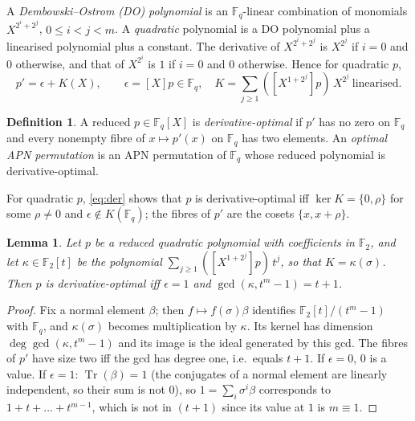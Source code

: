 \documentclass[preprint,12pt]{elsarticle}
\newtheorem{lemma}[theorem]{Lemma}
\theoremstyle{definition}
\newtheorem{definition}[theorem]{Definition}
\newcommand{\F}{\mathbb{F}}
\newcommand{\Tr}{\operatorname{Tr}}
\begin{document}
A \emph{Dembowski--Ostrom (DO) polynomial} is an $\F_q$-linear combination of monomials $X^{2^i+2^j}$, $0\le i<j<m$. A \emph{quadratic} polynomial is a DO polynomial plus a linearised polynomial plus a constant. The derivative of $X^{2^i+2^j}$ is $X^{2^j}$ if $i=0$ and $0$ otherwise, and that of $X^{2^i}$ is $1$ if $i=0$ and $0$ otherwise. Hence for quadratic $p$,
\begin{equation}\label{eq:der}
p'=\epsilon+K(X),\qquad \epsilon=[X]p\in\F_q,\quad K=\sum_{j\ge1}([X^{1+2^j}]p)\,X^{2^j}\ \text{linearised}.
\end{equation}

\begin{definition}\label{def:opt}
A reduced $p\in\F_q[X]$ is \emph{derivative-optimal} if $p'$ has no zero on $\F_q$ and every nonempty fibre of $x\mapsto p'(x)$ on $\F_q$ has two elements. An \emph{optimal APN permutation} is an APN permutation of $\F_q$ whose reduced polynomial is derivative-optimal.
\end{definition}
For quadratic $p$, \eqref{eq:der} shows that $p$ is derivative-optimal iff $\ker K=\{0,\rho\}$ for some $\rho\ne0$ and $\epsilon\notin K(\F_q)$; the fibres of $p'$ are the cosets $\{x,x+\rho\}$.

\begin{lemma}\label{lem:O}
Let $p$ be a reduced quadratic polynomial with coefficients in $\F_2$, and let $\kappa\in\F_2[t]$ be the polynomial $\sum_{j\ge1}([X^{1+2^j}]p)\,t^j$, so that $K=\kappa(\sigma)$. Then $p$ is derivative-optimal iff $\epsilon=1$ and $\gcd(\kappa,t^m-1)=t+1$.
\end{lemma}
\begin{proof}
Fix a normal element $\beta$; then $f\mapsto f(\sigma)\beta$ identifies $\F_2[t]/(t^m-1)$ with $\F_q$, and $\kappa(\sigma)$ becomes multiplication by $\kappa$. Its kernel has dimension $\deg\gcd(\kappa,t^m-1)$ and its image is the ideal generated by this gcd. The fibres of $p'$ have size two iff the gcd has degree one, i.e.\ equals $t+1$. If $\epsilon=0$, $0$ is a value. If $\epsilon=1$: $\Tr(\beta)=1$ (the conjugates of a normal element are linearly independent, so their sum is not $0$), so $1=\sum_i\sigma^i\beta$ corresponds to $1+t+\dots+t^{m-1}$, which is not in $(t+1)$ since its value at $1$ is $m\equiv1$.
\end{proof}
\end{document}
